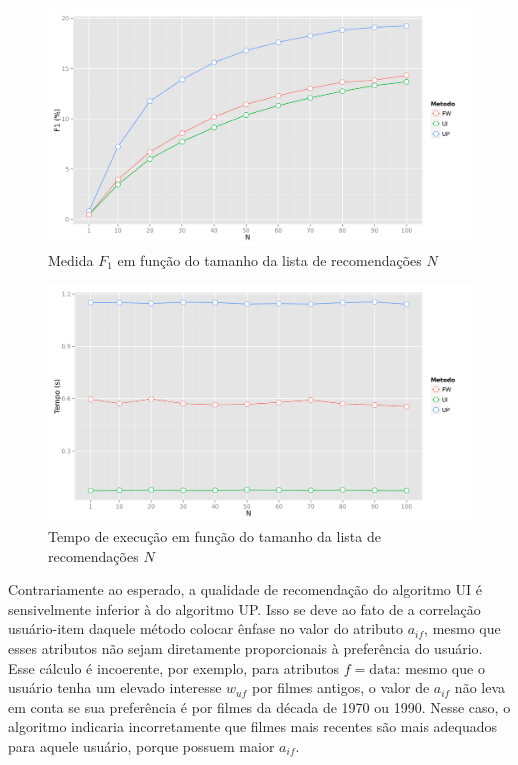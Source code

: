 \begin{figure}[htp]
    \begin{center}
    \includegraphics[width=1\textwidth]{img/F1_N}
    \end{center}
    \caption{Medida $F_1$ em função do tamanho da lista de recomendações $N$}
    \label{fig:F1_N}
\end{figure}

\begin{figure}[htp]
    \begin{center}
    \includegraphics[width=1\textwidth]{img/time_N}
    \end{center}
    \caption{Tempo de execução em função do tamanho da lista de recomendações $N$}
    \label{fig:time_N}
\end{figure}

Contrariamente ao esperado, a qualidade de recomendação do algoritmo UI é sensivelmente inferior à do algoritmo UP. Isso se deve ao fato de a correlação usuário-item daquele método colocar ênfase no valor do atributo $a_{if}$, mesmo que esses atributos não sejam diretamente proporcionais à preferência do usuário. Esse cálculo é incoerente, por exemplo, para atributos $f=\mathrm{data}$: mesmo que o usuário tenha um elevado interesse $w_{uf}$ por filmes antigos, o valor de $a_{if}$ não leva em conta se sua preferência é por filmes da década de 1970 ou 1990. Nesse caso, o algoritmo indicaria incorretamente que filmes mais recentes são mais adequados para aquele usuário, porque possuem maior $a_{if}$.

